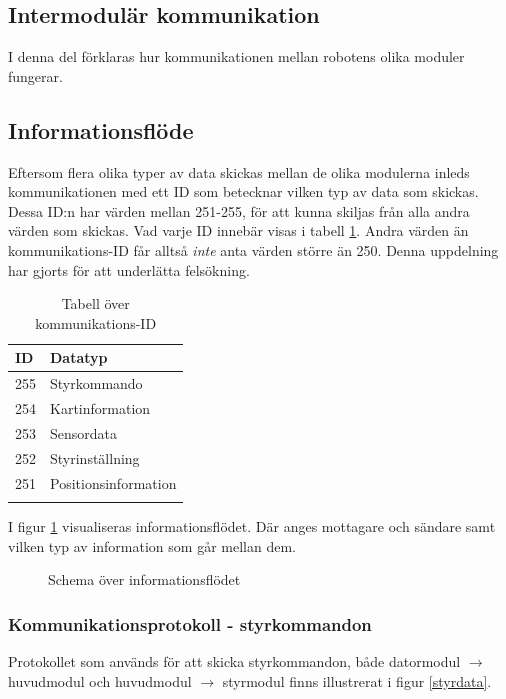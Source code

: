 \documentclass[11pt]{article}
\begin{document}
\begin{flushleft}
\pagebreak

\section{Intermodulär kommunikation}
I denna del förklaras hur kommunikationen mellan robotens olika moduler fungerar.

\subsection{Informationsflöde}
Eftersom flera olika typer av data skickas mellan de olika modulerna inleds kommunikationen med ett ID som betecknar vilken typ av data som skickas. Dessa ID:n har värden mellan 251-255, för att kunna skiljas från alla andra värden som skickas. Vad varje ID innebär visas i tabell \ref{kommunikationstab}. Andra värden än kommunikations-ID får alltså \emph{inte} anta värden större än 250. Denna uppdelning har gjorts för att underlätta felsökning.

\begin{longtable}[c]{| l | l |} \hline
  \centering
\textbf{ID} & \textbf{Datatyp} \\ \hline 
255 & Styrkommando \\ \hline
254 & Kartinformation \\ \hline
253 & Sensordata \\ \hline
252 & Styrinställning \\ \hline
251 & Positionsinformation \\ \hline

\caption{Tabell över kommunikations-ID}\label{kommunikationstab}
\end{longtable}

I figur \ref{informationFlow} visualiseras informationsflödet. Där anges mottagare och sändare samt vilken typ av information som går mellan dem.

\begin{figure}[htbp]
\centering
\noindent\resizebox{1\linewidth}{!}{
	}
	\caption{Schema över informationsflödet\label{informationFlow}}	
\end{figure}

\subsubsection{Kommunikationsprotokoll - styrkommandon}
Protokollet som används för att skicka styrkommandon, både datormodul $\rightarrow$ huvudmodul och huvudmodul $\rightarrow$ styrmodul finns illustrerat i figur \ref{styrdata}.


\end{flushleft}
\end{document}
